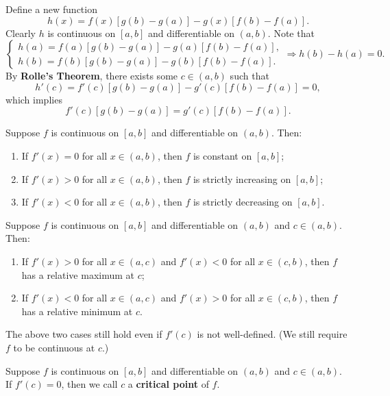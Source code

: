 	\begin{proofenv}
		Define a new function
		\[
		h(x) = f(x) \left[ g(b)-g(a) \right] - g(x) \left[ f(b)-f(a) \right].
		\]
		Clearly $h$ is continuous on $[a,b]$ and differentiable on $(a,b)$. Note that
		\[
		\begin{cases}
			h(a)=f(a)\left[ g(b)-g(a) \right] - g(a)\left[ f(b)-f(a) \right],\\[6pt]
			h(b)=f(b)\left[ g(b)-g(a) \right] - g(b)\left[ f(b)-f(a) \right].
		\end{cases}
		\Rightarrow h(b)-h(a)=0.
		\]
		By \textbf{Rolle's Theorem}, there exists some $c\in (a,b)$ such that
		\[
		h'(c) = f'(c)\left[ g(b)-g(a) \right] - g'(c)\left[ f(b)-f(a) \right] = 0,
		\]
		which implies
		\[
		f'(c)\left[ g(b)-g(a) \right] = g'(c)\left[ f(b)-f(a) \right].
		\]
	\end{proofenv}
	\begin{theoremenv}
		Suppose $f$ is continuous on $[a,b]$ and differentiable on $(a,b)$. Then:
		\begin{enumerate}
			\item [(1)] If $f'(x)=0$ for all $x\in (a,b)$, then $f$ is constant on $[a,b]$;
			\item [(2)] If $f'(x)>0$ for all $x\in (a,b)$, then $f$ is strictly increasing on $[a,b]$;
			\item [(3)] If $f'(x)<0$ for all $x\in (a,b)$, then $f$ is strictly decreasing on $[a,b]$.
		\end{enumerate}
	\end{theoremenv}
	\begin{theoremenv}
		Suppose $f$ is continuous on $[a,b]$ and differentiable on $(a,b)$ and $c\in (a,b)$. Then:
		\begin{enumerate}
			\item [(1)] If $f'(x)>0$ for all $x\in (a,c)$ and $f'(x)<0$ for all $x\in (c,b)$, then $f$ has a relative maximum at $c$;
			\item [(2)] If $f'(x)<0$ for all $x\in (a,c)$ and $f'(x)>0$ for all $x\in (c,b)$, then $f$ has a relative minimum at $c$.
		\end{enumerate}
	\end{theoremenv}
	\begin{remarkenv}
		The above two cases still hold even if $f'(c)$ is not well-defined. (We still require $f$ to be continuous at $c$.)
	\end{remarkenv}
	\begin{definitionenv}
		Suppose $f$ is continuous on $[a,b]$ and differentiable on $(a,b)$ and $c\in (a,b)$. If $f'(c)=0$, then we call $c$ a \textbf{critical point} of $f$.
	\end{definitionenv}

